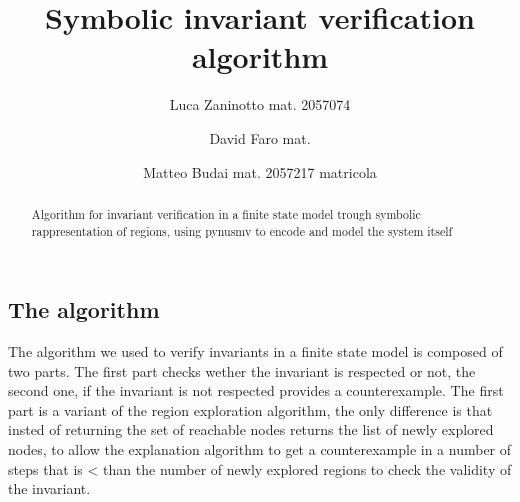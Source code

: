 \documentclass[9pt,oneside]{amsart}
\title{Symbolic invariant verification algorithm}
\author{
  Luca Zaninotto mat. 2057074 
  \and
  David Faro mat. 
  \and
  Matteo Budai mat. 2057217
  matricola
}
\begin{document}
\begin{abstract}
  Algorithm for invariant verification in a finite state model trough
  symbolic rappresentation of regions, using pynusmv to encode and
  model the system itself
\end{abstract}
\maketitle
\setlength{\columnsep}{20pt}
\begin{multicols}{2}
\section{The algorithm}\label{algo}
The algorithm we used to verify invariants in a finite state model is
composed of two parts. The first part checks wether the invariant is
respected or not, the second one, if the invariant is not respected
provides a counterexample. The first part is a variant of the region
exploration algorithm, the only difference is that insted of returning
the set of reachable nodes returns the list of newly explored nodes,
to allow the explanation algorithm to get a counterexample in a number
of steps that is < than the number of newly explored regions to check
the validity of the invariant.


\end{multicols}
\end{document}
